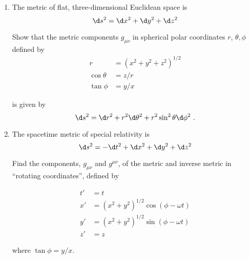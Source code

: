 \begin{problem}\leavevmode
    \begin{enumerate}[label=(\alph*)]
        \item The metric of flat, three-dimensional Euclidean space is
        \[
        \d s^2=\d x^2+\d y^2+\d z^2
        \]
        
        Show that the metric components $g_{\mu\nu}$ in spherical polar coordinates $r$, $\theta, \phi$ defined by
        \[\begin{aligned}
            r&=(x^2+y^2+z^2)^{1/2}\\
            \cos\theta&=z/r\\
            \tan\phi&=y/x
        \end{aligned}
        \]
        
        is given by
        \[
        \d s^2=\d r^2+r^2\d\theta^2+r^2\sin^2\theta\d\phi^2~.
        \]
        
        \item The spacetime metric of special relativity is
        \[
        \d s^2=-\d t^2+\d x^2+\d y^2+\d z^2
        \]
        
        Find the components, $g_{\mu\nu}$ and $g^{\mu\nu}$, of the metric and inverse metric in ``rotating coordinates'', defined by
        
        \[\begin{aligned}
            t'&=t\\
            x'&=(x^2+y^2)^{1/2}\cos(\phi-\omega t)\\
            y'&=(x^2+y^2)^{1/2}\sin(\phi-\omega t)\\
            z'&=z
        \end{aligned}\]
        
        where $\tan\phi=y/x$.
    \end{enumerate}
\end{problem}
